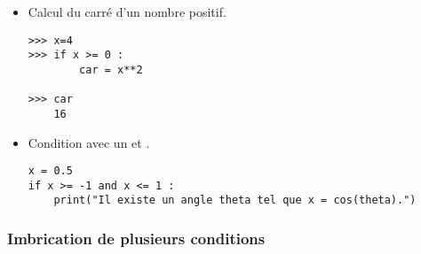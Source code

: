 
\begin{multicols}{2}
\begin{itemize}

\item Calcul du carré d'un nombre positif. 

\begin{lstlisting}
>>> x=4
>>> if x >= 0 : 
        car = x**2

>>> car 
	16
\end{lstlisting}

\vfill\null
\columnbreak 


\end{itemize}
\end{multicols}
\begin{itemize}

\item Condition avec un \og et \fg{}. 

\begin{lstlisting}
x = 0.5 
if x >= -1 and x <= 1 :
    print("Il existe un angle theta tel que x = cos(theta).") 

\end{lstlisting}
 \end{itemize}





\subsubsection{Imbrication de plusieurs conditions}

